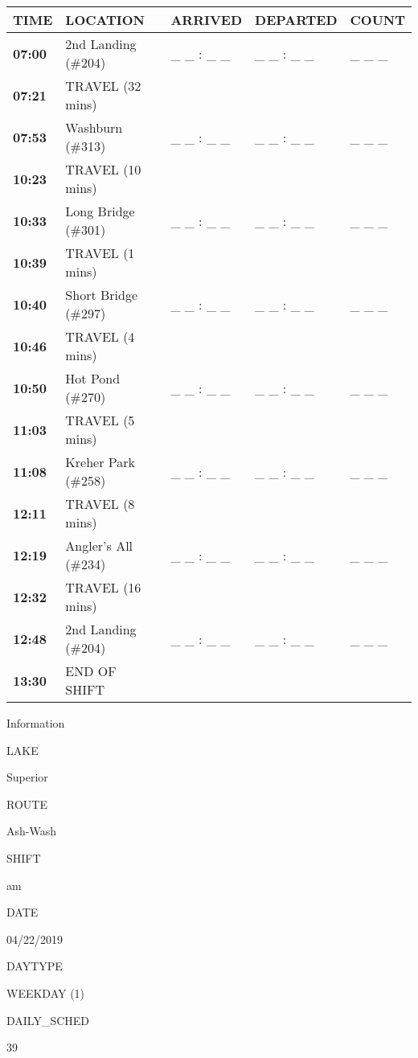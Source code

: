 \documentclass[]{article}
\begin{document}
\begin{tabular}{>{\bfseries}lllll}
\toprule
\textbf{TIME} & \textbf{LOCATION} & \textbf{ARRIVED} & \textbf{DEPARTED} & \textbf{COUNT}\\
\midrule
07:00 & 2nd Landing (\#204) & \_ \_ : \_ \_ & \_ \_ : \_ \_ & \_ \_ \_\\
07:21 & TRAVEL (32 mins) &  &  & \\
07:53 & Washburn (\#313) & \_ \_ : \_ \_ & \_ \_ : \_ \_ & \_ \_ \_\\
10:23 & TRAVEL (10 mins) &  &  & \\
10:33 & Long Bridge (\#301) & \_ \_ : \_ \_ & \_ \_ : \_ \_ & \_ \_ \_\\
10:39 & TRAVEL (1 mins) &  &  & \\
10:40 & Short Bridge (\#297) & \_ \_ : \_ \_ & \_ \_ : \_ \_ & \_ \_ \_\\
10:46 & TRAVEL (4 mins) &  &  & \\
10:50 & Hot Pond (\#270) & \_ \_ : \_ \_ & \_ \_ : \_ \_ & \_ \_ \_\\
11:03 & TRAVEL (5 mins) &  &  & \\
11:08 & Kreher Park (\#258) & \_ \_ : \_ \_ & \_ \_ : \_ \_ & \_ \_ \_\\
12:11 & TRAVEL (8 mins) &  &  & \\
12:19 & Angler's All (\#234) & \_ \_ : \_ \_ & \_ \_ : \_ \_ & \_ \_ \_\\
12:32 & TRAVEL (16 mins) &  &  & \\
12:48 & 2nd Landing (\#204) & \_ \_ : \_ \_ & \_ \_ : \_ \_ & \_ \_ \_\\
13:30 & END OF SHIFT &  &  & \\
\bottomrule
\end{tabular}\newpage

Information

LAKE

Superior

ROUTE

Ash-Wash

SHIFT

am

DATE

04/22/2019

DAYTYPE

WEEKDAY (1)

DAILY\_SCHED

39

\vspace{24pt}
\end{document}
